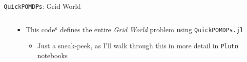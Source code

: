 \begin{frame}[fragile]{\texttt{QuickPOMDPs}: Grid World}
\begin{columns}[T,onlytextwidth]
    \begin{column}{0.43\linewidth}
        \scalebox{0.28}{\usebox{\gridworldcode}}
    \end{column}
    \begin{column}{0.57\linewidth}
        {\footnotesize
        \begin{itemize}
            \item This code$^a$ defines the entire \textit{Grid World} problem using \texttt{QuickPOMDPs.jl}
            \begin{itemize}
                \item Just a sneak-peek, as I'll walk through this in more detail in \texttt{Pluto} notebooks
            \end{itemize}
        \end{itemize}
        }
        \begin{figure}
            \centering
            \def\svgwidth{\columnwidth}
            \scalebox{0.7}{}
        \end{figure}
    \end{column}
\end{columns}


\end{frame}


